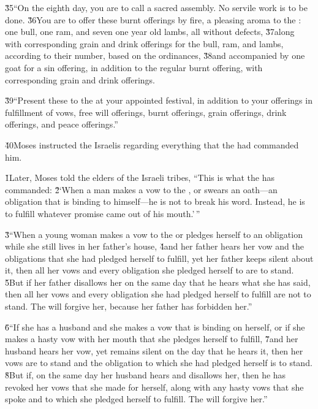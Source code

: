 \v{35}``On the eighth day, you are to call a sacred assembly. No servile work is to be done. \v{36}You are to offer these burnt offerings by fire, a pleasing aroma to the : one bull, one ram, and seven one year old lambs, all without defects, \v{37}along with corresponding grain and drink offerings for the bull, ram, and lambs, according to their number, based on the ordinances, \v{38}and accompanied by one goat for a sin offering, in addition to the regular burnt offering, with corresponding grain and drink offerings.

\v{39}``Present these to the  at your appointed festival, in addition to your offerings in fulfillment of vows, free will offerings, burnt offerings, grain offerings, drink offerings, and peace offerings.''

\v{40}Moses instructed the Israelis regarding everything that the  had commanded him.

\v{1}Later, Moses told the elders of the Israeli tribes, ``This is what the  has commanded: \v{2}`When a man makes a vow to the , or swears an oath---an obligation that is binding to himself---he is not to break his word. Instead, he is to fulfill whatever promise came out of his mouth.'\,''

\v{3}``When a young woman makes a vow to the  or pledges herself to an obligation while she still lives in her father's house, \v{4}and her father hears her vow and the obligations that she had pledged herself to fulfill, yet her father keeps silent about it, then all her vows and every obligation she pledged herself to are to stand. \v{5}But if her father disallows her on the same day that he hears what she has said, then all her vows and every obligation she had pledged herself to fulfill are not to stand. The  will forgive her, because her father has forbidden her.''

\v{6}``If she has a husband and she makes a vow that is binding on herself, or if she makes a hasty vow with her mouth that she pledges herself to fulfill, \v{7}and her husband hears her vow, yet remains silent on the day that he hears it, then her vows are to stand and the obligation to which she had pledged herself is to stand. \v{8}But if, on the same day her husband hears and disallows her, then he has revoked her vows that she made for herself, along with any hasty vows that she spoke and to which she pledged herself to fulfill. The  will forgive her.''

